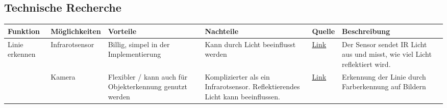 \documentclass{article}
\begin{document}
\begin{landscape} %
	\section{Technische Recherche}
	\renewcommand*{\arraystretch}{1.8}
	\begin{longtable}{>{\raggedright\arraybackslash}m{3cm}>{\raggedright\arraybackslash}m{3cm}>{\raggedright\arraybackslash}m{5cm}>{\raggedright\arraybackslash}m{5cm}>{\raggedright\centering\arraybackslash}m{1cm}>{\raggedright\arraybackslash}m{7cm}}		
		\textbf{Funktion}               & \textbf{Möglichkeiten} & \textbf{Vorteile}                                                                                & \textbf{Nachteile}                                                             & \textbf{Quelle}                                                                                              & \textbf{Beschreibung}                                                                                                                                                                                                                                                                                                                                                                                                                                                                     \\
		\hline
		Linie erkennen                  & Infrarotsensor          & Billig, simpel in der Implementierung                                                         & Kann durch Licht beeinflusst werden                                            & \href{https://www.futurelearn.com/info/courses/robotics-with-raspberry-pi/0/steps/75899}{Link}               & Der Sensor sendet IR Licht aus und misst, wie viel Licht reflektiert wird.                                                                                                                                                                                                                                                                                                                                                                                                                \\
		\cline{2-6}
										& Kamera                  & Flexibler / kann auch für Objekterkennung genutzt werden                                        & Komplizierter als ein Infrarotsensor. Reflektierendes Licht kann beeinflussen. & \href{https://www.instructables.com/Line-Following-Robot-Using-Smartphones-Camera/}{Link}                    & Erkennung der Linie durch Farberkennung auf Bildern                                                                                                                                                                                                                                                                                                                                                                                                                                       \\

\end{longtable}
\end{landscape}
\end{document}
